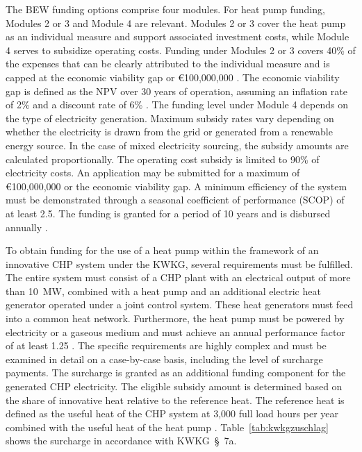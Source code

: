 \documentclass[letterpaper,11pt]{article}
\begin{document}
		The BEW funding options comprise four modules. For heat pump funding, Modules 2 or 3 and Module 4 are relevant. Modules 2 or 3 cover the heat pump as an individual measure and support associated investment costs, while Module 4 serves to subsidize operating costs. Funding under Modules 2 or 3 covers 40\% of the expenses that can be clearly attributed to the individual measure and is capped at the economic viability gap or €100,000,000 \cite{BAFA2024}. The economic viability gap is defined as the NPV over 30 years of operation, assuming an inflation rate of 2\% and a discount rate of 6\% \cite{BAFA2024Modul4}. The funding level under Module 4 depends on the type of electricity generation. Maximum subsidy rates vary depending on whether the electricity is drawn from the grid or generated from a renewable energy source. In the case of mixed electricity sourcing, the subsidy amounts are calculated proportionally. The operating cost subsidy is limited to 90\% of electricity costs. An application may be submitted for a maximum of €100,000,000 or the economic viability gap. A minimum efficiency of the system must be demonstrated through a seasonal coefficient of performance (SCOP) of at least 2.5. The funding is granted for a period of 10 years and is disbursed annually \cite{BAFA2024}.
		
		To obtain funding for the use of a heat pump within the framework of an innovative CHP system under the KWKG, several requirements must be fulfilled. The entire system must consist of a CHP plant with an electrical output of more than 10~MW, combined with a heat pump and an additional electric heat generator operated under a joint control system. These heat generators must feed into a common heat network. Furthermore, the heat pump must be powered by electricity or a gaseous medium and must achieve an annual performance factor of at least 1.25 \cite{BAFAKWK}. The specific requirements are highly complex and must be examined in detail on a case-by-case basis, including the level of surcharge payments. The surcharge is granted as an additional funding component for the generated CHP electricity. The eligible subsidy amount is determined based on the share of innovative heat relative to the reference heat. The reference heat is defined as the useful heat of the CHP system at 3,000 full load hours per year combined with the useful heat of the heat pump \cite{BAFAKWK}. Table~\ref{tab:kwkgzuschlag} shows the surcharge in accordance with KWKG~§~7a.
		
\end{document}
